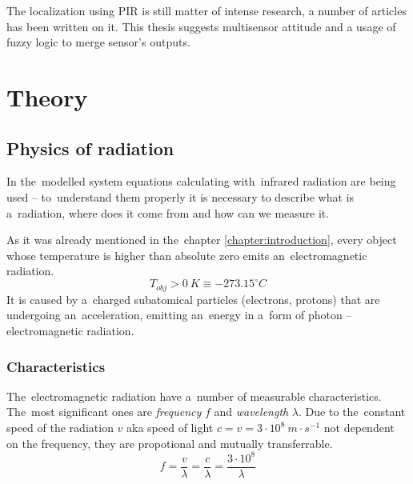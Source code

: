 The localization using PIR is still matter of intense research, a number of articles has been
written on it. This thesis suggests multisensor attitude and a usage of fuzzy logic to merge
sensor's outputs.










\chapter{Theory}
\label{theory}


\section{Physics of radiation}

In the~modelled system equations calculating with~infrared radiation are being used -- to~understand
them properly it is necessary to describe what is a~radiation, where does it come from and how can
we measure it. 

As it was already mentioned in the~chapter \ref{chapter:introduction}, every object whose temperature
is higher than absolute zero emits an~electromagnetic radiation.
\begin{equation}
T_{obj}>0~K\equiv -273.15^{\circ}C
\end{equation}
It is caused by a~charged subatomical particles (electrons, protons) that are undergoing an~acceleration,
emitting an~energy in a~form of photon -- electromagnetic radiation.


\subsection*{Characteristics}
The~electromagnetic radiation have a~number of measurable characteristics. The~most significant ones
are {\it frequency} $f$ and {\it wavelength} $\lambda$. Due to the~constant speed of the radiation $v$
aka speed of light $c = v = 3\cdot10^{8}~m\cdot s^{-1}$ not dependent on the frequency, they are
propotional and mutually transferrable.
\begin{equation}
f=\frac{v}{\lambda}=\frac{c}{\lambda}=\frac{3\cdot10^{8}}{\lambda}
\end{equation}

